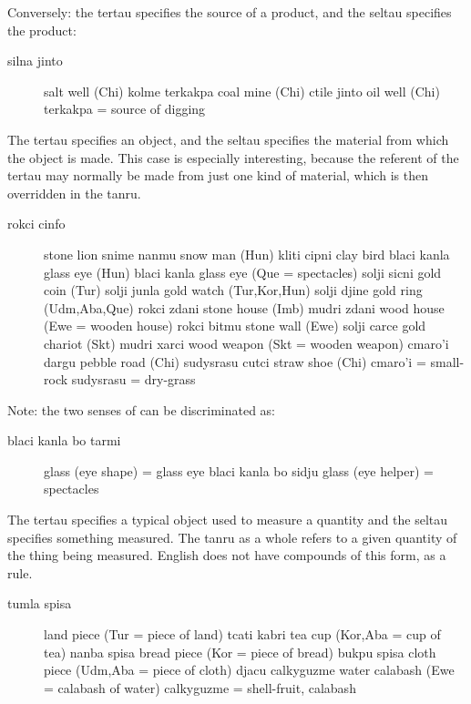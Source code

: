 Conversely: the tertau specifies the source of a product, and
    the seltau specifies the product: 
\begin{description}
\item[silna jinto] salt well (Chi) kolme terkakpa coal mine (Chi) ctile jinto oil well (Chi) terkakpa = source of digging
\end{description}

The tertau specifies an object, and the seltau specifies the
    material from which the object is made. This case is especially
    interesting, because the referent of the tertau may normally be
    made from just one kind of material, which is then overridden
    in the tanru. 
\begin{description}
\item[rokci cinfo] stone lion snime nanmu snow man (Hun) kliti cipni clay bird blaci kanla glass eye (Hun) blaci kanla glass eye (Que = spectacles) solji sicni gold coin (Tur) solji junla gold watch (Tur,Kor,Hun) solji djine gold ring (Udm,Aba,Que) rokci zdani stone house (Imb) mudri zdani wood house (Ewe = wooden house) rokci bitmu stone wall (Ewe) solji carce gold chariot (Skt) mudri xarci wood weapon (Skt = wooden weapon) cmaro'i dargu pebble road (Chi) sudysrasu cutci straw shoe (Chi) cmaro'i = small-rock sudysrasu = dry-grass

\end{description}

Note: the two senses of  can be discriminated
    as:
\begin{description}
\item[blaci kanla bo tarmi] glass (eye shape) = glass eye blaci kanla bo sidju glass (eye helper) = spectacles
\end{description}

The tertau specifies a typical object used to measure a
    quantity and the seltau specifies something measured. The tanru
    as a whole refers to a given quantity of the thing being
    measured. English does not have compounds of this form, as a
    rule. 
\begin{description}
\item[tumla spisa] land piece (Tur = piece of land) tcati kabri tea cup (Kor,Aba = cup of tea) nanba spisa bread piece (Kor = piece of bread) bukpu spisa cloth piece (Udm,Aba = piece of cloth) djacu calkyguzme water calabash (Ewe = calabash of water) calkyguzme = shell-fruit, calabash
\end{description}

